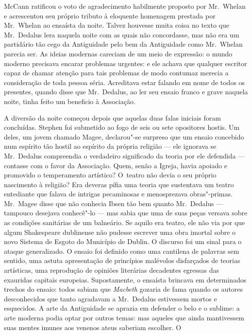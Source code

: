 McCann ratificou o voto de agradecimento habilmente proposto por Mr.~Whelan e
acrescentou seu próprio tributo à eloquente homenagem prestada por Mr.~Whelan
ao ensaísta da noite.  Talvez houvesse muita coisa no texto que Mr.~Dedalus
lera naquela noite com as quais não concordasse, mas não era um partidário tão
cego da Antiguidade pelo bem da Antiguidade como Mr.~Whelan parecia ser.  As
ideias modernas careciam de um meio de expressão: o mundo moderno precisava
encarar problemas urgentes: e ele achava que qualquer escritor capaz de chamar
atenção para tais problemas de modo contumaz merecia a consideração de toda
pessoa séria.  Acreditava estar falando em nome de todos os presentes, quando
disse que Mr.~Dedalus, ao ler seu ensaio franco e grave naquela noite, tinha
feito um beneficio à Associação.

A diversão da noite começou depois que aquelas duas falas iniciais foram
concluídas.  Stephen foi submetido\label{refintro} ao fogo de seis ou sete opositores hostis.
Um deles, um jovem chamado Magee, declarou"-se surpreso que um ensaio concebido
num espírito tão hostil ao espírito da própria religião --- ele ignorava se 
Mr.~Dedalus compreendia o verdadeiro significado da teoria por ele defendida ---
contasse com o favor da Associação.  Quem, senão a Igreja, havia apoiado e
promovido o temperamento artístico?  \mbox{O teatro} não devia o seu próprio
nascimento à religião?  Era deveras pífia uma teoria que sustentava um teatro
entediante que falava de intrigas pecaminosas e menosprezava obras"-primas.  
Mr.~Magee disse que não conhecia Ibsen tão bem quanto Mr.~Dedalus --- tampouco
desejava conhecê"-lo --- mas sabia que uma de suas peças versava sobre as
condições sanitárias de um balneário.  Se aquilo era teatro, ele não via por
que algum Shakespeare dublinense não pudesse escrever uma obra imortal sobre o
novo Sistema de Esgoto do Município de Dublin.  O discurso foi um sinal para o
ataque generalizado.  O ensaio foi definido como uma cantilena de palavras sem
sentido, uma astuta apresentação de princípios malévolos disfarçados de teorias
artísticas, uma reprodução de opiniões literárias decadentes egressas das
exauridas capitais europeias.  Supostamente, o ensaísta brincava em
determinados trechos do ensaio: todos sabiam que \textit{Macbeth} gozaria de
fama quando os autores desconhecidos que tanto agradavam a Mr.~Dedalus
estivessem mortos e esquecidos.  A arte da Antiguidade se aprazia em defender o
belo e o sublime: a arte moderna podia optar por outros temas: mas aqueles que
ainda mantivessem suas mentes imunes aos venenos ateus saberiam escolher.  O
